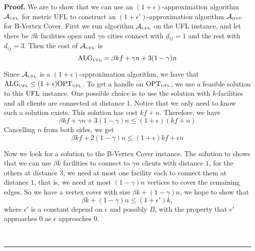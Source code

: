 \documentclass[oneside,final]{ucr}
\newenvironment{proof}[1][Proof]{\textbf{#1.} }{\ \rule{0.5em}{0.5em}}
\begin{document}
\begin{proof}
  We are to show that we can use an $(1+\epsilon)$-approximation
  algorithm $\calA_{\smallUFL}$ for metric UFL to construct an
  $(1+\epsilon')$-approximation algorithm $\calA_{\smallBVC}$ for
  B-Vertex Cover. First we run algorithm $\calA_{\smallUFL}$ on the
  UFL instance, and let there be $\beta k$ facilities open and $\gamma
  n$ cities connect with $d_{ij}=1$ and the rest with $d_{ij} =
  3$. Then the cost of $\calA_{\smallUFL}$ is
  \begin{equation*}
    \mbox{\rm ALG}_{\mbox{\tiny\rm UFL}} = \beta k f + \gamma n + 3 (1 - \gamma) n
  \end{equation*}

  Since $\calA_{\smallUFL}$ is a $(1+\epsilon)$-approximation algorithm, we
  have that $\mbox{\rm ALG}_{\mbox{\tiny\rm UFL}} \leq (1+\epsilon) \mbox{\rm OPT}_{\mbox{\tiny\rm UFL}}$. To get a handle on
  $\mbox{\rm OPT}_{\mbox{\tiny\rm UFL}}$, we use a feasible solution to this $\mbox{\rm UFL}$
  instance. One possible choice is to use the solution with
  $k$-facilities and all clients are connected at distance $1$. Notice
  that we only need to know such a solution exists. This solution has
  cost $kf + n$. Therefore, we have
  \begin{equation*}
    \beta k f + \gamma n + 3 (1 - \gamma) n \leq (1 + \epsilon) (kf + n)
  \end{equation*}
  Cancelling $n$ from both sides, we get
  \begin{equation}
    \label{eq:APX:UFL}
    \beta k f + 2(1-\gamma) n \leq (1+\epsilon)kf + \epsilon n
  \end{equation}

  Now we look for a solution to the B-Vertex Cover instance. The
  solution to {\UFL} shows that we can use $\beta k$ facilities to
  connect to $\gamma n$ clients with distance $1$, for the others at
  distance $3$, we need at most one facility each to connect them at
  distance $1$, that is, we need at most $(1-\gamma)n$ vertices to
  cover the remaining edges. So we have a vertex cover with size
  $\beta k + (1 - \gamma) n$, we hope to show that
  \begin{equation}
    \label{eq:APX:BVC}
    \beta k + (1 - \gamma) n \leq (1 + \epsilon') k,
  \end{equation}
  where $\epsilon'$ is a constant depend on $\epsilon$ and possibly
  $B$, with the property that $\epsilon'$ approaches $0$ as $\epsilon$
  approaches $0$.


\end{proof}
\end{document}
